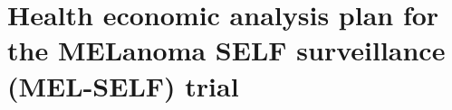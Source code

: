 \chapter{Health economic analysis plan for the MELanoma SELF surveillance (MEL-SELF) trial}
\label{ap-h}



